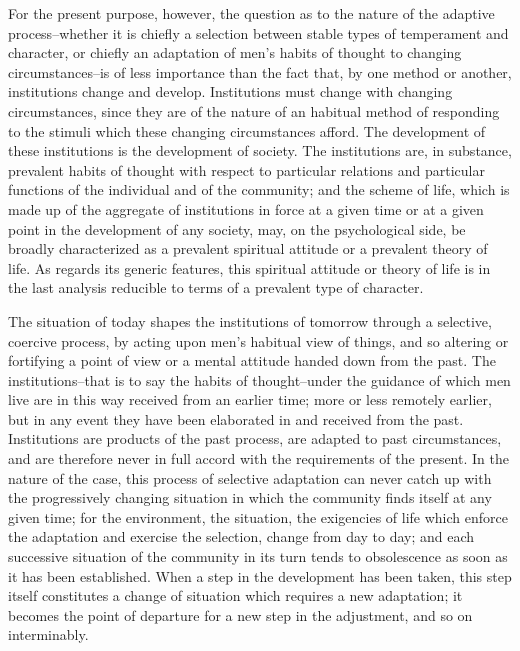 \documentclass[12pt]{report}
\begin{document}
For the present purpose, however, the question as to the nature of the
adaptive process--whether it is chiefly a selection between stable types
of temperament and character, or chiefly an adaptation of men's habits
of thought to changing circumstances--is of less importance than the
fact that, by one method or another, institutions change and develop.
Institutions must change with changing circumstances, since they are
of the nature of an habitual method of responding to the stimuli
which these changing circumstances afford. The development of these
institutions is the development of society. The institutions are,
in substance, prevalent habits of thought with respect to particular
relations and particular functions of the individual and of the
community; and the scheme of life, which is made up of the aggregate
of institutions in force at a given time or at a given point in the
development of any society, may, on the psychological side, be broadly
characterized as a prevalent spiritual attitude or a prevalent theory of
life. As regards its generic features, this spiritual attitude or theory
of life is in the last analysis reducible to terms of a prevalent type
of character.

The situation of today shapes the institutions of tomorrow through
a selective, coercive process, by acting upon men's habitual view
of things, and so altering or fortifying a point of view or a mental
attitude handed down from the past. The institutions--that is to say the
habits of thought--under the guidance of which men live are in this way
received from an earlier time; more or less remotely earlier, but in
any event they have been elaborated in and received from the past.
Institutions are products of the past process, are adapted to past
circumstances, and are therefore never in full accord with the
requirements of the present. In the nature of the case, this process of
selective adaptation can never catch up with the progressively changing
situation in which the community finds itself at any given time; for
the environment, the situation, the exigencies of life which enforce the
adaptation and exercise the selection, change from day to day; and each
successive situation of the community in its turn tends to obsolescence
as soon as it has been established. When a step in the development has
been taken, this step itself constitutes a change of situation which
requires a new adaptation; it becomes the point of departure for a new
step in the adjustment, and so on interminably.
\end{document}
